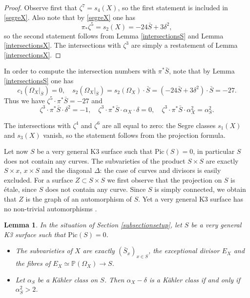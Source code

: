 \documentclass[JEP,XML,SOM,Unicode,NoEqCountersInSection,published]{cedram}
\theoremstyle{plain}
\newtheorem{lemma}[theorem]{Lemma}
\theoremstyle{definition}
\newcommand{\PP}{\ensuremath{\mathbb{P}}}
\begin{document}
\begin{proof}
Observe first that $\zeta^7= s_4(X)$, so the first statement is included in \eqref{segreX}.
Also note that by \eqref{segreX} one has
\[
\pi_* \zeta^5 = s_2(X) = - 24 \bar S + 3 \delta^2,
\]
so the second statement follows from Lemma \ref{intersectionsS} and Lemma \ref{intersectionsX}.
The intersections with $\zeta^3$ are simply a restatement of Lemma \ref{intersectionsX}.
\end{proof}

In order to compute the intersection numbers with $\pi^* \bar S$, note that by Lemma \ref{intersectionsS}
one has
\[
c_1(\Omega_X|_{\bar S})= 0 , \quad
s_2(\Omega_X|_{\bar S}) = s_2(\Omega_X) \cdot \bar S = (-24 \bar S + 3 \delta^2) \cdot \bar S = - 27.
\]
Thus we have $\zeta^5 \cdot \pi^* \bar S= -27$ and
\begin{equation} \label{up7}
\zeta^3 \cdot \pi^* \bar S \cdot \delta^2 = -1, \quad
\zeta^3 \cdot \pi^* \bar S \cdot \alpha_X \cdot \delta = 0, \quad
\zeta^3 \cdot \pi^* \bar S \cdot \alpha_X^2 = \alpha_S^2.
\end{equation}

The intersections with $\zeta^4$ and $\zeta^6$ are all equal to zero: the
Segre classes $s_1(X)$ and $s_3(X)$ vanish, so the statement follows from the projection formula.

Let now $S$ be a very general K3 surface such that $\mbox{Pic}(S)=0$, in particular $S$ does not contain any curves.
The subvarieties of the product $S \times S$ are exactly $S \times x$, $x \times S$ and the diagonal $\Delta$: the case
of curves and divisors is easily excluded. For a surface $Z \subset S \times S$ we first observe
that the projection on $S$ is étale, since $S$ does not contain any curve. Since $S$ is simply connected, we obtain
that $Z$ is the graph of an automorphism of $S$. Yet a very general K3 surface has no non-trivial automorphisms \cite[Cor.\,1.6]{Ogu08}.

\begin{lemma} \label{lemmakaehlerX}
In the situation of Section \ref{subsectionsetup},
let $S$ be a very general K3 surface such that $\mbox{Pic}(S)=0$.
\begin{itemize}
\item The subvarieties of $X$ are exactly $(\bar S_x)_{x \in S}$, the exceptional divisor $E_X$ and the fibres of $E_X \simeq \PP(\Omega_X) \to S$.
\item Let $\alpha_S$ be a Kähler class on $S$. Then $\alpha_X-\delta$ is a Kähler class if and only if
$\alpha_S^2>2$.
\end{itemize}
\end{lemma}
\end{document}
